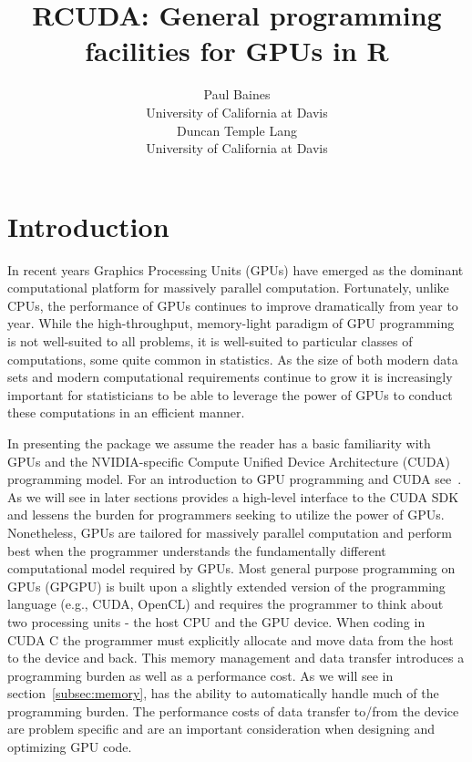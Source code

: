 \documentclass[article]{jss}
\author{Paul Baines\\University of California at Davis \\
 Duncan Temple Lang\\University of California at Davis}
\title{RCUDA: General programming facilities for GPUs in R}
\def\C{\proglang{C}}
\def\R{\proglang{R}}
\begin{document}


\section{Introduction}\label{sec:Introduction}
In recent years Graphics Processing Units (GPUs) have emerged as the 
dominant computational platform for massively  parallel computation. 
Fortunately, unlike CPUs, the performance of GPUs continues to improve
dramatically from year to year. While the high-throughput, memory-light
paradigm of GPU programming is not well-suited to all problems, it is
well-suited to particular classes of computations, some quite common in
statistics. As the size of both modern data sets and modern computational
requirements continue to grow it is increasingly important for statisticians
to be able to leverage the power of GPUs to conduct these computations in 
an efficient manner.


In presenting the  package we assume the reader has a basic
familiarity with GPUs and the NVIDIA-specific Compute Unified Device
Architecture (CUDA) programming model. For an introduction to GPU
programming and CUDA see~\citep{bib:pmpp}. As we will see in later sections
 provides a high-level interface to the CUDA SDK and lessens
the burden for \R{} programmers seeking to utilize the power of GPUs.
Nonetheless, GPUs are tailored for massively parallel computation and
perform best when the programmer understands the fundamentally different
computational model required by GPUs.
Most general purpose programming on GPUs (GPGPU) is built upon a slightly extended
version of the  \C{}  programming language (e.g., CUDA, OpenCL) and requires
the programmer to think about two processing units - the host CPU
and the GPU device. When coding in CUDA C the programmer must explicitly 
allocate and move data from the host to the device and back. This memory 
management and data transfer introduces a programming burden as well as a 
performance cost. As we will see in section~\ref{subsec:memory},  
has the ability to automatically handle much of the programming burden. 
The performance costs of data transfer to/from the device are problem specific
and are an important consideration when designing and optimizing GPU code.
\end{document}
